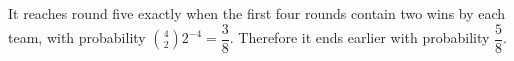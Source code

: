 It reaches round five exactly when the first four rounds contain two wins by each team, with probability $\binom42 2^{-4}=\dfrac{3}{8}$. Therefore it ends earlier with probability $\boxed{\dfrac{5}{8}}$.
